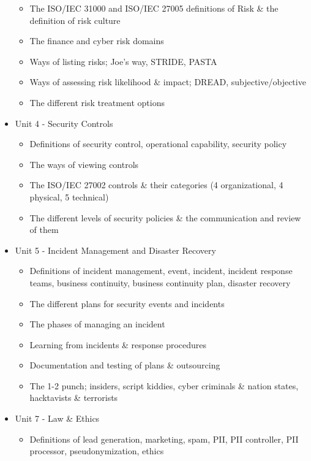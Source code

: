 \documentclass[tikz,border=10pt]{project_plan}
\begin{document}
\begin{itemize}
        \begin{itemize}
          \item The ISO/IEC 31000 and ISO/IEC 27005 definitions of Risk \& the definition of risk culture
          \item The finance and cyber risk domains
          \item Ways of listing risks; Joe's way, STRIDE, PASTA
          \item Ways of assessing risk likelihood \& impact; DREAD, subjective/objective
          \item The different risk treatment options
        \end{itemize}
  \item Unit 4 - Security Controls
        \begin{itemize}
          \item Definitions of security control, operational capability, security policy
          \item The ways of viewing controls
          \item The ISO/IEC 27002 controls \& their categories (4 organizational, 4 physical, 5 technical)
          \item The different levels of security policies \& the communication and review of them
        \end{itemize}
  \item Unit 5 - Incident Management and Disaster Recovery
        \begin{itemize}
          \item Definitions of incident management, event, incident, incident response teams, business continuity, business continuity plan, disaster recovery
          \item The different plans for security events and incidents
          \item The phases of managing an incident
          \item Learning from incidents \& response procedures
          \item Documentation and testing of plans \& outsourcing
          \item The 1-2 punch; insiders, script kiddies, cyber criminals \& nation states, hacktavists \& terrorists
        \end{itemize}
  \item Unit 7 - Law \& Ethics
        \begin{itemize}
          \item Definitions of lead generation, marketing, spam, PII, PII controller, PII processor, pseudonymization, ethics

\end{itemize}
\end{itemize}
\end{document}
